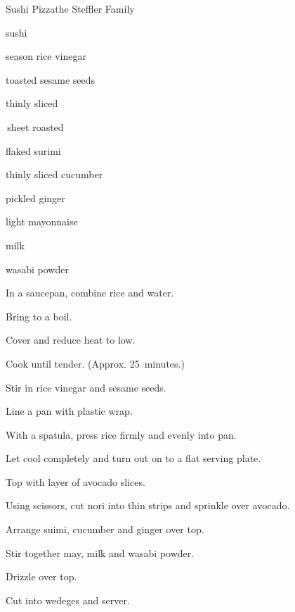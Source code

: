 \begin{recipe}{Sushi Pizza}{the Steffler Family}{}

\begin{ingredients}
\item {} sushi 
\item \C{\quarter} season rice vinegar
\item {} toasted sesame seeds
\item \half thinly sliced 
\item \half\,sheet roasted 
\item \C{\threequarter} flaked surimi
\item \C{\half} thinly sliced cucumber
\item {} pickled ginger
\item {} light mayonnaise
\item {} milk
\item {} wasabi powder
\end{ingredients}

\begin{directions}
\item In a saucepan, combine rice and \C{1\quarter} water.
\item Bring to a boil.
\item Cover and reduce heat to low.
\item Cook until tender. (Approx. 25~minutes.)
\item Stir in rice vinegar and sesame seeds.
\item Line a pan with plastic wrap.
\item With a spatula, press rice firmly and evenly into pan.
\item Let cool completely and turn out on to a flat serving plate.
\item Top with layer of avocado slices.
\item Using scissors, cut nori into thin strips and sprinkle over avocado.
\item Arrange suimi, cucumber and ginger over top.
\item Stir together may, milk and wasabi powder.
\item Drizzle over top.
\item Cut into wedeges and server.
\end{directions}
\end{recipe}
